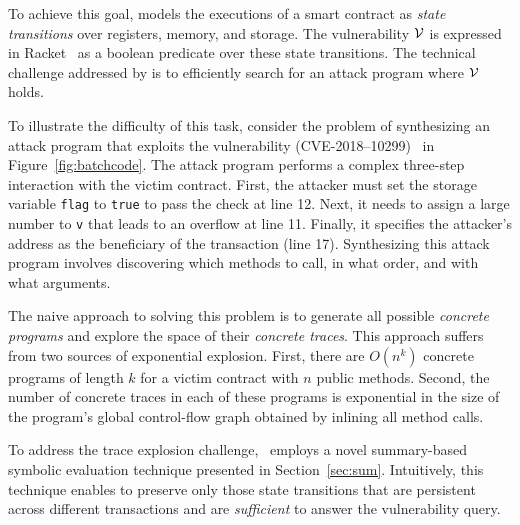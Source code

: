 To achieve this goal, \toolname  models 
the executions of a smart contract as \emph{state transitions} over registers, memory, and storage. 
The vulnerability $\mathcal{V}$ 
is expressed in Racket~\cite{racket} as a boolean predicate over these state transitions. 
The technical challenge addressed by \toolname is to efficiently search for an attack program where $\mathcal{V}$ 
holds. 

To illustrate the difficulty of this task, consider the problem of synthesizing an attack 
program that exploits 
the \batchoverflow vulnerability (CVE-2018–10299)~\cite{attack-int} in Figure~\ref{fig:batchcode}. 
The attack program performs a complex three-step 
interaction with the victim contract.  First, the attacker must set the storage variable 
\texttt{flag} to \texttt{true} to pass the check at line 12. Next, it needs to 
assign a large number to \texttt{v} that leads to an overflow at line 11. 
Finally, it specifies the attacker's address as the beneficiary of the transaction (line 17). 
Synthesizing this attack program involves discovering which methods to call, in what order, and with what arguments. 


The naive approach to solving this problem is to generate 
all possible \emph{concrete programs} and explore the space of 
their \emph{concrete traces}. This approach suffers from two sources of exponential explosion. 
First, there are $O(n^k)$ concrete programs of length $k$ for a victim contract with $n$ public methods.  
Second, the number of concrete traces in each of these programs is exponential in the size of the 
program's global control-flow graph obtained by inlining all method calls. 

To address the trace explosion challenge, \toolname\ employs a novel summary-based 
symbolic evaluation technique presented in Section~\ref{sec:sum}. Intuitively,
this technique enables \toolname to preserve only those state transitions that 
are persistent across different transactions and are \emph{sufficient} to answer
the vulnerability query.

